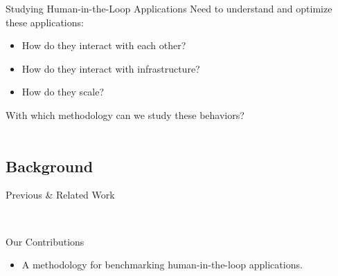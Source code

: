 \documentclass[aspectratio=1610]{beamer}
\begin{document}
\begin{frame}{Studying Human-in-the-Loop Applications}
    Need to understand and optimize these applications:%
    \begin{itemize}
        \item How do they interact with each other?
        \item How do they interact with infrastructure?
        \item How do they scale?
    \end{itemize}%
    \vspace{1em}%
    \begin{center}
        {\Large With which methodology can we study these behaviors?}\\
        \vspace{2em}%
        \\
        \Large\bfseries\color{red}
    \end{center}
\end{frame}

\subsection{Background}
\begin{frame}{Previous \& Related Work}
    \begin{center}
        \\
    \end{center}
\end{frame}

\begin{frame}{Our Contributions}

    \begin{itemize}
        \itemsep3em
        \item A methodology for benchmarking human-in-the-loop applications.
    \end{itemize}

\end{frame}
\end{document}
